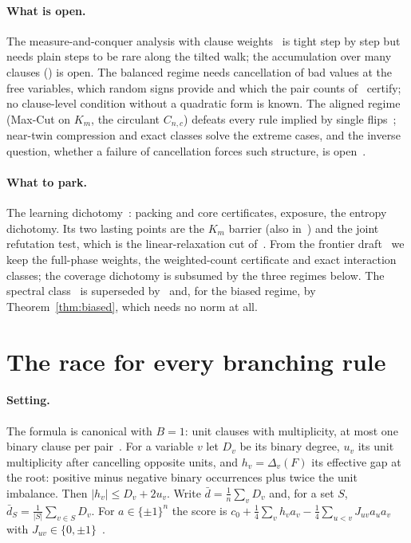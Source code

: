 \documentclass[11pt,a4paper]{article}
\theoremstyle{definition}
\theoremstyle{remark}
\newcommand{\dS}{\bar d_S}
\begin{document}
\paragraph{What is open.} The measure-and-conquer analysis with clause
weights~\cite[Sections~6--8]{N4} is tight step by step but needs plain steps to
be rare along the tilted walk; the accumulation over many clauses
(\cite[Problem~17]{N4}) is open. The balanced regime needs cancellation of bad
values at the free variables, which random signs provide and which the pair
counts of~\cite{CC} certify; no clause-level condition without a quadratic form
is known. The aligned regime (Max-Cut on $K_m$, the circulant $C_{n,c}$) defeats
every rule implied by single flips~\cite[Section~9]{N4}; near-twin compression
and exact classes solve the extreme cases, and the inverse question, whether a
failure of cancellation forces such structure, is open~\cite{NT}.

\paragraph{What to park.} The learning dichotomy~\cite{N6}: packing and core
certificates, exposure, the entropy dichotomy. Its two lasting points are the
$K_m$ barrier (also in~\cite{N4}) and the joint refutation test, which is the
linear-relaxation cut of~\cite[Proposition~7]{N4}. From the frontier
draft~\cite{N5} we keep the full-phase weights, the weighted-count certificate
and exact interaction classes; the coverage dichotomy is subsumed by the three
regimes below. The spectral class~\cite{N9} is superseded by~\cite{CC,CA} and,
for the biased regime, by Theorem~\ref{thm:biased}, which needs no norm at all.

\section{The race for every branching rule}\label{sec:race}

\paragraph{Setting.} The formula is canonical with $B=1$: unit clauses with
multiplicity, at most one binary clause per pair~\cite[Section~2]{N3}. For a
variable $v$ let $D_v$ be its binary degree, $u_v$ its unit multiplicity after
cancelling opposite units, and $h_v=\Delta_v(F)$ its effective gap at the root:
positive minus negative binary occurrences plus twice the unit imbalance. Then
$|h_v|\le D_v+2u_v$. Write $\bar d=\frac1n\sum_vD_v$ and, for a set $S$,
$\dS=\frac1{|S|}\sum_{v\in S}D_v$. For $a\in\{\pm1\}^n$ the score is
$c_0+\frac14\sum_vh_va_v-\frac14\sum_{u<v}J_{uv}a_ua_v$ with
$J_{uv}\in\{0,\pm1\}$~\cite[Definition~1]{N9}.
\end{document}

